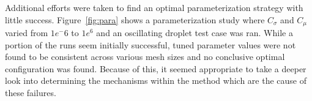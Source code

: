 Additional efforts were taken to  find an optimal parameterization strategy with little success. Figure~\ref{fig:para} shows a parameterization study where $C_{\sigma}$ and $C_{\mu}$ varied from $1e^-6$ to $1e^6$ and an oscillating droplet test case was ran. While a portion of the runs seem initially successful, tuned parameter values were not found to be consistent across various mesh sizes and no conclusive optimal configuration was found. Because of this, it seemed appropriate to take a deeper look into determining the mechanisms within the method which are the cause of these failures. 
